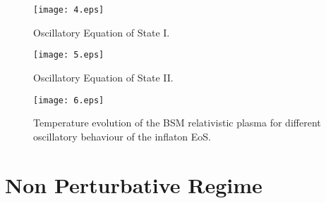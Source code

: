 \documentclass[%
aps,prd,nofootinbib,showkeys,a4paper,10pt
]{revtex4-2}
\begin{document}
\begin{figure}%
\centering
\texttt{[image: 4.eps]}
\caption{Oscillatory Equation of State I. }
\label{fig: 4}
\end{figure}


\begin{figure}%
\centering
\texttt{[image: 5.eps]}
\caption{Oscillatory Equation of State II.}
\label{fig: 5}
\end{figure}





\begin{figure}%
\centering
\hspace*{-1cm}
\texttt{[image: 6.eps]}
\caption{Temperature evolution of the BSM relativistic plasma for different oscillatory behaviour of the inflaton EoS.}
\label{fig: 6}
\end{figure}




\section{Non Perturbative Regime}
\end{document}
